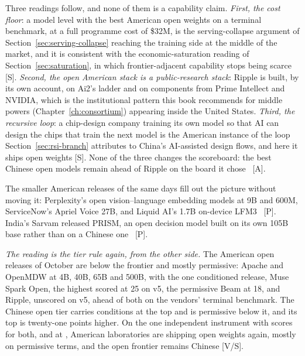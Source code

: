 Three readings follow, and none of them is a capability claim. \emph{First, the cost floor}: a model level with the best American open weights on a terminal benchmark, at a full programme cost of \$32M, is the serving-collapse argument of Section~\ref{sec:serving-collapse} reaching the training side at the middle of the market, and it is consistent with the economic-saturation reading of Section~\ref{sec:saturation}, in which frontier-adjacent capability stops being scarce [S]. \emph{Second, the open American stack is a public-research stack}: Ripple is built, by its own account, on Ai2's ladder and on components from Prime Intellect and NVIDIA, which is the institutional pattern this book recommends for middle powers (Chapter~\ref{ch:consortium}) appearing inside the United States. \emph{Third, the recursive loop}: a chip-design company training its own model so that AI can design the chips that train the next model is the American instance of the loop Section~\ref{sec:rsi-branch} attributes to China's AI-assisted design flows, and here it ships open weights [S]. None of the three changes the scoreboard: the best Chinese open models remain ahead of Ripple on the board it chose~\cite{lit-witteveen-ripple} [A].

The smaller American releases of the same days fill out the picture without moving it: Perplexity's open vision--language embedding models at 9B and 600M, ServiceNow's Apriel Voice 27B, and Liquid AI's 1.7B on-device LFM3~\cite{lit-berman-nov} [P]. India's Sarvam released PRISM, an open decision model built on its own 105B base rather than on a Chinese one~\cite{lit-berman-nov} [P].

\emph{The reading is the tier rule again, from the other side.} The American open releases of October are below the frontier and mostly permissive: Apache and OpenMDW at 4B, 40B, 65B and 500B, with the one conditioned release, Muse Spark Open, the highest scored at 25 on v5, the permissive Beam at 18, and Ripple, unscored on v5, ahead of both on the vendors' terminal benchmark. The Chinese open tier carries conditions at the top and is permissive below it, and its top is twenty-one points higher. On the one independent instrument with scores for both, and at \datafreeze, American laboratories are shipping open weights again, mostly on permissive terms, and the open frontier remains Chinese [V/S].

